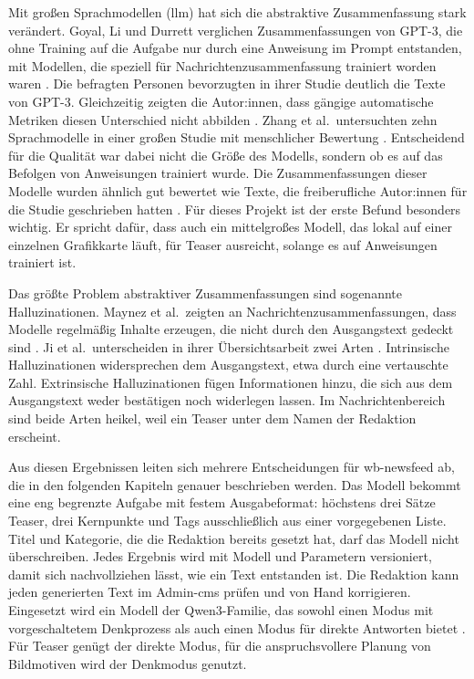 Mit großen Sprachmodellen (\gls{llm}) hat sich die abstraktive Zusammenfassung stark verändert.
Goyal, Li und Durrett verglichen Zusammenfassungen von GPT-3, die ohne Training auf die Aufgabe nur durch eine Anweisung im Prompt entstanden, mit Modellen, die speziell für Nachrichtenzusammenfassung trainiert worden waren \cite{goyal2022news}.
Die befragten Personen bevorzugten in ihrer Studie deutlich die Texte von GPT-3.
Gleichzeitig zeigten die Autor:innen, dass gängige automatische Metriken diesen Unterschied nicht abbilden \cite{goyal2022news}.
Zhang et al.\ untersuchten zehn Sprachmodelle in einer großen Studie mit menschlicher Bewertung \cite{zhang2024benchmarking}.
Entscheidend für die Qualität war dabei nicht die Größe des Modells, sondern ob es auf das Befolgen von Anweisungen trainiert wurde.
Die Zusammenfassungen dieser Modelle wurden ähnlich gut bewertet wie Texte, die freiberufliche Autor:innen für die Studie geschrieben hatten \cite{zhang2024benchmarking}.
Für dieses Projekt ist der erste Befund besonders wichtig.
Er spricht dafür, dass auch ein mittelgroßes Modell, das lokal auf einer einzelnen Grafikkarte läuft, für Teaser ausreicht, solange es auf Anweisungen trainiert ist.

Das größte Problem abstraktiver Zusammenfassungen sind sogenannte Halluzinationen.
Maynez et al.\ zeigten an Nachrichtenzusammenfassungen, dass Modelle regelmäßig Inhalte erzeugen, die nicht durch den Ausgangstext gedeckt sind \cite{maynez2020faithfulness}.
Ji et al.\ unterscheiden in ihrer Übersichtsarbeit zwei Arten \cite{ji2023hallucination}.
Intrinsische Halluzinationen widersprechen dem Ausgangstext, etwa durch eine vertauschte Zahl.
Extrinsische Halluzinationen fügen Informationen hinzu, die sich aus dem Ausgangstext weder bestätigen noch widerlegen lassen.
Im Nachrichtenbereich sind beide Arten heikel, weil ein Teaser unter dem Namen der Redaktion erscheint.

Aus diesen Ergebnissen leiten sich mehrere Entscheidungen für wb-newsfeed ab, die in den folgenden Kapiteln genauer beschrieben werden.
Das Modell bekommt eine eng begrenzte Aufgabe mit festem Ausgabeformat: höchstens drei Sätze Teaser, drei Kernpunkte und Tags ausschließlich aus einer vorgegebenen Liste.
Titel und Kategorie, die die Redaktion bereits gesetzt hat, darf das Modell nicht überschreiben.
Jedes Ergebnis wird mit Modell und Parametern versioniert, damit sich nachvollziehen lässt, wie ein Text entstanden ist.
Die Redaktion kann jeden generierten Text im Admin-\gls{cms} prüfen und von Hand korrigieren.
Eingesetzt wird ein Modell der Qwen3-Familie, das sowohl einen Modus mit vorgeschaltetem Denkprozess als auch einen Modus für direkte Antworten bietet \cite{qwen2025qwen3}.
Für Teaser genügt der direkte Modus, für die anspruchsvollere Planung von Bildmotiven wird der Denkmodus genutzt.

